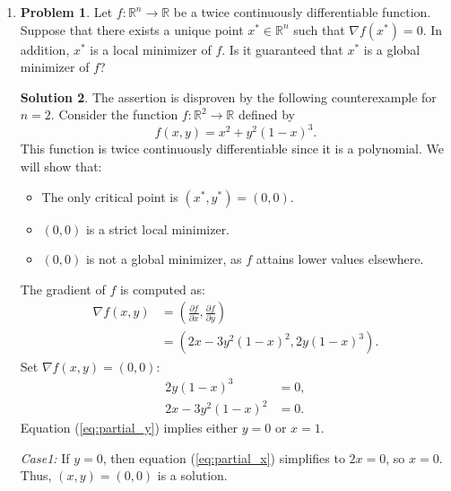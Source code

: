 \documentclass[12pt]{article}
\theoremstyle{definition}
\newtheorem*{solution}{\normalfont\textbf{Solution}}
\newtheorem*{Problem}{\noindent\textbf{Problem}}
\begin{document}
\begin{enumerate}[leftmargin=*]
\begin{solution}
            The existence of directional minima along every line through \( 0 \) does not imply a local minimum for \( f \) at \( 0 \).
        \end{solution}
    
    \item \begin{Problem}
            Let \( f : \mathbb{R}^n \to \mathbb{R} \) be a twice continuously differentiable function. Suppose that there exists a unique point \( x^* \in \mathbb{R}^n \) such that \( \nabla f(x^*) = 0 \). In addition, \( x^* \) is a local minimizer of \( f \). Is it guaranteed that \( x^* \) is a global minimizer of \( f \)?
        \end{Problem}
        \begin{solution}
            The assertion is disproven by the following counterexample for \( n = 2 \).
            Consider the function \( f : \mathbb{R}^2 \to \mathbb{R} \) defined by
            \[
            f(x, y) = x^2 + y^2 (1 - x)^3.
            \]
            This function is twice continuously differentiable since it is a polynomial. We will show that:
            \begin{itemize}
                \item The only critical point is \( (x^*, y^*) = (0, 0) \).
                \item \( (0, 0) \) is a strict local minimizer.
                \item \( (0, 0) \) is not a global minimizer, as \( f \) attains lower values elsewhere.
            \end{itemize}
            The gradient of \( f \) is computed as:
            \begin{align*}
            \nabla f(x, y) 
            &= \left( \frac{\partial f}{\partial x}, \frac{\partial f}{\partial y} \right) \\
            &= \left( 2x - 3y^2 (1 - x)^2,  2y (1 - x)^3 \right).
            \end{align*}
            Set \( \nabla f(x, y) = (0, 0) \):
            \begin{align}
                2y (1 - x)^3 &= 0, \label{eq:partial_y} \\
                2x - 3y^2 (1 - x)^2 &= 0. \label{eq:partial_x}
            \end{align}
            Equation (\ref{eq:partial_y}) implies either \( y = 0 \) or \( x = 1 \).
                
            \textit{Case1:} If \( y = 0 \), then equation (\ref{eq:partial_x}) simplifies to \( 2x = 0 \), so \( x = 0 \). Thus, \( (x, y) = (0, 0) \) is a solution.
                

\end{solution}
\end{enumerate}
\end{document}
